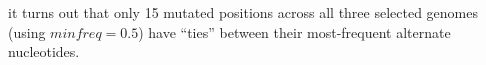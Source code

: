 it turns out that only 15 mutated positions across all three selected genomes
(using $minfreq = 0.5$) have ``ties'' between their most-frequent alternate
nucleotides.
